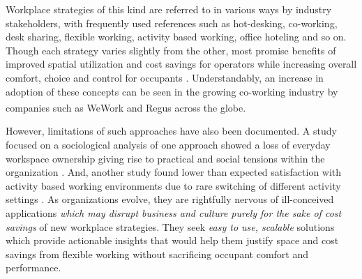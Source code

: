 \documentclass[]{interact}
\theoremstyle{plain}%
\theoremstyle{definition}
\theoremstyle{remark}
\begin{document}

Workplace strategies of this kind are referred to in various ways by industry stakeholders, with frequently used references such as hot-desking, co-working, desk sharing, flexible working, activity based working, office hoteling and so on. Though each strategy varies slightly from the other, most promise benefits of improved spatial utilization and cost savings for operators while increasing overall comfort, choice and control for occupants \citep{Engelen2018IsReview}. Understandably, an increase in adoption of these concepts can be seen in the growing co-working industry by companies such as WeWork\textsuperscript{\textregistered} and Regus\textsuperscript{\textregistered} across the globe.  %

However, limitations of such approaches have also been documented. A study focused on a sociological analysis of one approach showed a loss of everyday workspace ownership giving rise to practical and social tensions within the organization \citep{Hirst2011SettlersHot-desking}. And, another study found lower than expected satisfaction with activity based working environments due to rare switching of different activity settings \citep{Hoendervanger2016FlexibilityEnvironments}. As organizations evolve, they are rightfully nervous of ill-conceived applications \emph{which may disrupt business and culture purely for the sake of cost savings} of new workplace strategies. They seek \emph{easy to use, scalable} solutions which provide actionable insights that would help them justify space and cost savings from flexible working without sacrificing occupant comfort and performance. 

\end{document}

